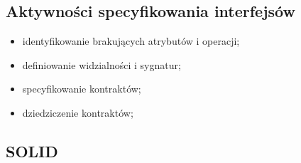 \documentclass[../main.tex]{subfiles}
\begin{document}
    \subsection{Aktywności specyfikowania interfejsów}
    \begin{itemize}
        \item identyfikowanie brakujących atrybutów i operacji;
        \item definiowanie widzialności i sygnatur;
        \item specyfikowanie kontraktów;
        \item dziedziczenie kontraktów;
    \end{itemize}



    \subsection{SOLID}
\end{document}
